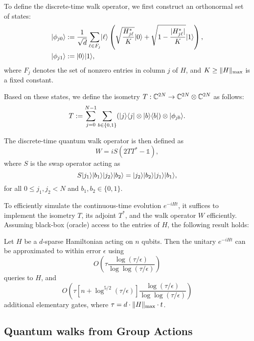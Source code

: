 \documentclass[11pt]{article}
\theoremstyle{definition}
\begin{document}
To define the discrete-time walk operator, we first construct an orthonormal set of states:
\begin{align}
    \lvert\phi_{j0}\rangle & := \frac{1}{\sqrt{d}} \sum_{\ell \in F_j} \lvert\ell\rangle \left( \sqrt{\frac{H_{j\ell}^*}{K}} \lvert0\rangle + \sqrt{1 - \frac{\lvert H_{j\ell}^*\rvert}{K}} \lvert1\rangle \right), \label{eq:walk-sim} \\
    \lvert\phi_{j1}\rangle & := \lvert0\rangle \lvert1\rangle, \nonumber
\end{align}
where \( F_j \) denotes the set of nonzero entries in column \( j \) of \( H \), and \( K \ge \lVert H\rVert_{\mathrm{max}} \) is a fixed constant.

Based on these states, we define the isometry \( T : \mathbb{C}^{2N} \to \mathbb{C}^{2N} \otimes \mathbb{C}^{2N} \) as follows:
\begin{equation}
    \label{eq:walk-isom}
    T := \sum_{j = 0}^{N - 1} \sum_{b \in \{0, 1\}} (\lvert j\rangle\langle j\rvert \otimes \lvert b\rangle\langle b\rvert) \otimes \lvert\phi_{jb}\rangle.
\end{equation}

The discrete-time quantum walk operator is then defined as
\[
W = iS(2TT^* - \mathds{1}),
\]
where \( S \) is the swap operator acting as
\[
S \lvert j_1\rangle \lvert b_1\rangle \lvert j_2\rangle \lvert b_2\rangle = \lvert j_2\rangle \lvert b_2\rangle \lvert j_1\rangle \lvert b_1\rangle,
\]
for all \( 0 \le j_1, j_2 < N \) and \( b_1, b_2 \in \{0, 1\} \).

To efficiently simulate the continuous-time evolution \( e^{-iHt} \), it suffices to implement the isometry \( T \), its adjoint \( T^* \), and the walk operator \( W \) efficiently. Assuming black-box (oracle) access to the entries of \( H \), the following result holds:

\begin{theorem}
\label{thm:sparse-sim}
Let \( H \) be a \( d \)-sparse Hamiltonian acting on \( n \) qubits. Then the unitary \( e^{-iHt} \) can be approximated to within error \( \epsilon \) using
\[
O\left( \tau \frac{\log(\tau / \epsilon)}{\log\log(\tau / \epsilon)} \right)
\]
queries to \( H \), and
\[
O\left( \tau \left[ n + \log^{5 / 2}(\tau / \epsilon) \right] \frac{\log(\tau / \epsilon)}{\log\log(\tau / \epsilon)} \right)
\]
additional elementary gates, where \( \tau = d \cdot \lVert H\rVert_{\mathrm{max}} \cdot t \).
\end{theorem}




\subsection*{Quantum walks from Group Actions}
\end{document}
